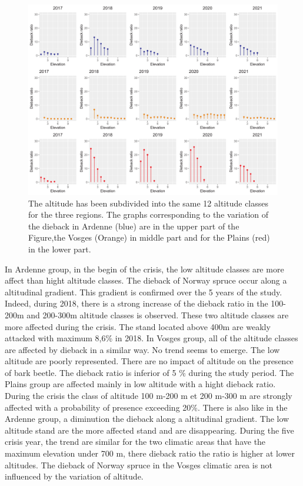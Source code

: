 \documentclass[3p,procedia]{elsarticle}
\begin{document}
\begin{figure}[htbp] 
\centering
	\includegraphics[width=\textwidth]{synthese_color_11_2022.png}
     \caption{The altitude has been subdivided into the same 12 altitude classes for the three regions. 
The graphs corresponding to the variation of the dieback in Ardenne (blue) are in the upper part of the Figure,the Vosges (Orange) in middle part and for the Plains (red) in the lower part.
}
	\label{alti_sco}
\end{figure}

In Ardenne group, in the begin of the crisis, the low altitude classes are more affect than hight altitude classes.
The dieback of Norway spruce occur along a altitudinal  gradient.
This gradient is confirmed over the 5 years of the study.
Indeed, during 2018, there is a strong increase of the dieback ratio in the 100-200m and 200-300m altitude classes is observed. 
These two altitude classes are more affected during the crisis.
The stand located above 400m are weakly attacked with maximum 8,6\% in 2018.
In Vosges group, all of the altitude classes are affected by dieback in a similar way.
No trend seems to emerge.
The low altitude are poorly represented. 
There are no impact of altitude on the presence of bark beetle. 
The dieback ratio is inferior of 5 \% during the study period.
The Plains group are affected mainly in low altitude with a hight dieback ratio. 
During the crisis the class of altitude 100 m-200 m et 200 m-300 m are strongly affected with a probability of presence exceeding 20\%.
There is also like in the Ardenne group, a diminution the dieback along a altitudinal gradient.
The low altitude stand are the more affected stand and are disappearing.
During the five crisis year, the trend are similar for the two climatic areas that have the maximum elevation under 700 m, there dieback ratio the ratio is higher at lower altitudes. 
The dieback of Norway spruce in the Vosges climatic area is not influenced by the variation of altitude.
\end{document}
